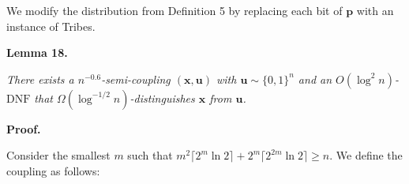 \documentclass[10pt,a4paper]{article}
\begin{document}
We modify the distribution from Definition 5 by replacing each bit of $\mathbf{p}$ with an instance of Tribes.\par





\par\medskip\noindent\textbf{
\textbf{Lemma 18}\textbf{.}
}\par



\emph{There exists a $n^{-0.6}$-semi-coupling $(\bm{x},\bm{u})$ with $\bm{u}\sim\{0,1\}^{n}$ and an $O(\log^{2}n)$-$\mathrm{DNF}$ that $\Omega(\log^{-1/2}n)$-distinguishes $\bm{x}$ from $\bm{u}$.}\par






\par\medskip\noindent\textbf{Proof.}\par




Consider the smallest $m$ such that $m^{2}\lceil 2^{m}\ln 2\rceil+2^{m}\lceil 2^{2m}\ln 2\rceil\geq n$. We define the coupling as follows:\par
\end{document}
